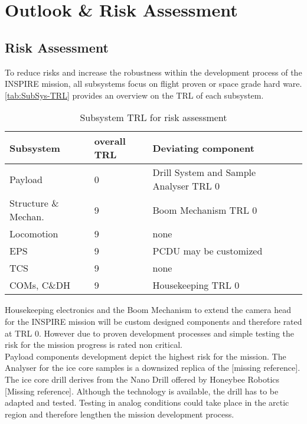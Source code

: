 \chapter{Outlook \& Risk Assessment}
\label{chap:outlook}

\section{Risk Assessment}
\label{sec:RiskAssessment}

To reduce risks and increase the robustness within the development process of the INSPIRE mission, all subsystems focus on flight proven or space grade hard ware. \autoref{tab:SubSys-TRL} provides an overview on the TRL of each subsystem. 
 
\begin{table}[h]
\centering
\begin{tabular}{llll}
Subsystem            & overall TRL & Deviating component      &  \\ \hline\hline
Payload              & 0           & Drill System and Sample Analyser TRL 0 &  \\
Structure \& Mechan. & 9           & Boom Mechanism TRL 0     &  \\
Locomotion           & 9           & none                     &  \\
EPS                  & 9           & PCDU may be customized                     &  \\
TCS                  & 9           & none                     &  \\
COMs, C\&DH          & 9           & Housekeeping TRL 0       & 	 \\ \hline
\end{tabular}
\caption{Subsystem TRL for risk assessment}
\label{tab:SubSys-TRL}
\end{table}

Housekeeping electronics and the Boom Mechanism to extend the camera head for the INSPIRE mission will be custom designed components and therefore rated at TRL 0. However due to proven development processes and simple testing the risk for the mission progress is rated non critical.  \\

Payload components development depict the highest risk for the mission. The Analyser for the ice core samples is a downsized replica of the [missing reference]. 
The ice core drill derives from the Nano Drill offered by Honeybee Robotics [Missing reference]. Although the technology is available, the drill has to be adapted and tested. Testing in analog conditions could take place in the arctic region and therefore lengthen the mission development process. \\

